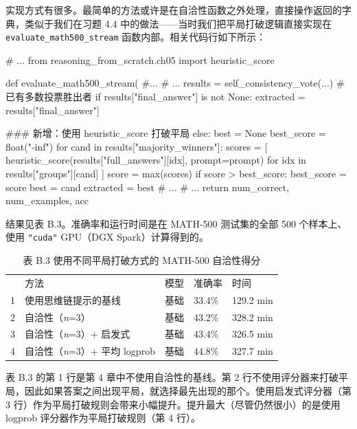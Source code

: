 实现方式有很多。最简单的方法或许是在自洽性函数之外处理，直接操作返回的字典，类似于我们在习题 4.4 中的做法——当时我们把平局打破逻辑直接实现在 \texttt{evaluate\_math500\_stream} 函数内部。相关代码行如下所示：

\begin{codebox}
# ...
from reasoning_from_scratch.ch05 import heuristic_score

def evaluate_math500_stream(
    #...
    # ...
            results = self_consistency_vote(...)
            # 已有多数投票胜出者
            if results["final_answer"] is not None:
                extracted = results["final_answer"]

            ### 新增：使用 heuristic_score 打破平局
            else:
                best = None
                best_score = float("-inf")
                for cand in results["majority_winners"]:
                    scores = [
                        heuristic_score(results["full_answers"][idx],
                                        prompt=prompt)
                        for idx in results["groups"][cand]
                    ]
                    score = max(scores)
                    if score > best_score:
                        best_score = score
                        best = cand
                extracted = best
            # ...
    # ...
    return num_correct, num_examples, acc
\end{codebox}

结果见表 B.3。准确率和运行时间是在 MATH-500 测试集的全部 500 个样本上、使用 \texttt{"}\texttt{cuda}\texttt{"} GPU（DGX Spark）计算得到的。

\begin{table}[htbp]
\centering\small
\centering
\caption{表 B.3 使用不同平局打破方式的 MATH-500 自洽性得分}
\begin{tabularx}{\linewidth}{@{}c@{}XXXX}
\toprule
 & 方法 & 模型 & 准确率 & 时间 \\
1 & 使用思维链提示的基线 & 基础 & 33.4\% & 129.2 min \\
2 & 自洽性（\emph{n}=3） & 基础 & 43.2\% & 328.2 min \\
3 & 自洽性（\emph{n}=3）+ 启发式 & 基础 & 43.4\% & 326.5 min \\
4 & 自洽性（\emph{n}=3）+ 平均 logprob & 基础 & 44.8\% & 327.7 min \\ \bottomrule
\end{tabularx}
\end{table}

表 B.3 的第 1 行是第 4 章中不使用自洽性的基线。第 2 行不使用评分器来打破平局，因此如果答案之间出现平局，就选择最先出现的那个。使用启发式评分器（第 3 行）作为平局打破规则会带来小幅提升。提升最大（尽管仍然很小）的是使用 logprob 评分器作为平局打破规则（第 4 行）。

